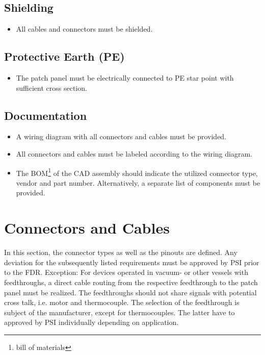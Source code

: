 \subsection{Shielding}
\begin{itemize}
    \item All cables and connectors must be shielded.
\end{itemize}

\subsection{Protective Earth (PE)}
\begin{itemize}
    \item The patch panel must be electrically connected to PE star point with sufficient cross section.
\end{itemize}

\subsection{Documentation}
\begin{itemize}
    \item A wiring diagram with all connectors and cables must be provided.
    \item All connectors and cables must be labeled according to the wiring diagram.
    \item The BOM\footnote{bill of materials} of the CAD assembly should indicate the utilized connector type, vendor and part number. Alternatively, a separate list of components must be provided.
\end{itemize}

\section{Connectors and Cables}

In this section, the connector types as well as the pinouts are defined.
Any deviation for the subsequently listed requirements must be approved by PSI prior to the FDR.
Exception: For devices operated in vacuum- or other vessels with feedthroughs, a direct cable routing from the respective feedthrough to the patch panel must be realized.
The feedthroughs should not share signals with potential cross talk, i.e. motor and thermocouple.
The selection of the feedthrough is subject of the manufacturer, except for thermocouples.
The latter have to approved by PSI individually depending on application.

